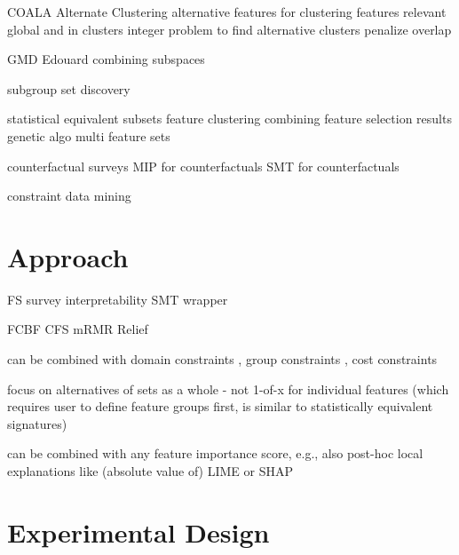\documentclass{article}
\begin{document}
COALA \cite{bae2006coala}
Alternate Clustering \cite{bailey2014alternative}
alternative features for clustering \cite{tao2012novel}
features relevant global and in clusters \cite{guan2011unified}
integer problem to find alternative clusters \cite{bae2010clustering}
penalize overlap \cite{mueller2009relevant}

GMD \cite{trittenbach2019dimension}
Edouard \cite{fouche2021efficient}
combining subspaces \cite{nguyen20134s}

subgroup set discovery \cite{leeuwen2012diverse}

statistical equivalent subsets \cite{lagani2017feature, borboudakis2021extending, tsamardinos2003towards, dougherty2006number}
feature clustering \cite{mueller2021feature}
combining feature selection results \cite{woznica2012model}
genetic algo multi feature sets \cite{siddiqi2020genetic}

counterfactual surveys \cite{verma2020counterfactual, stepin2021survey}
MIP for counterfactuals \cite{mohammadi2021scaling}
SMT for counterfactuals \cite{karimi2020model}

constraint data mining \cite{grossi2017survey}

\section{Approach}
\label{sec:approach}

FS survey \cite{li2017feature, chandrashekar2014survey, guyon2003introduction}
interpretability \cite{carvalho2019machine}
SMT \cite{barrett2018satisfiability}
wrapper \cite{kohavi1997wrappers}

FCBF \cite{yu2003feature}
CFS \cite{hall1999correlation}
mRMR \cite{peng2005feature}
Relief \cite{kira1992feature}

can be combined with domain constraints \cite{groves2015toward}, group constraints \cite{yuan2006model}, cost constraints \cite{paclik2002feature}

focus on alternatives of sets as a whole - not 1-of-x for individual features (which requires user to define feature groups first, is similar to statistically equivalent signatures)

can be combined with any feature importance score, e.g., also post-hoc local explanations like (absolute value of) LIME \cite{ribeiro2016should} or SHAP \cite{lundberg2017unified}

\section{Experimental Design}
\label{sec:experimental-design}
\end{document}
